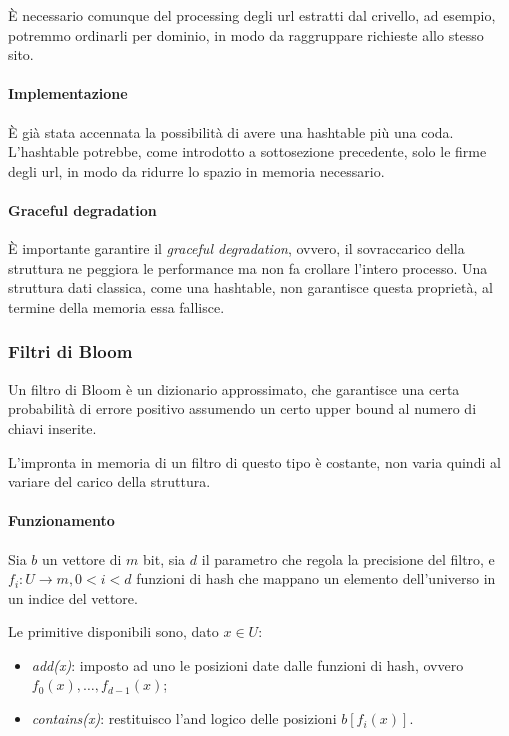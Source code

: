 \begin{remark}
    È necessario comunque del processing degli url estratti dal crivello, ad esempio, 
    potremmo ordinarli per dominio, in modo da raggruppare richieste allo stesso sito.
\end{remark}

\paragraph{Implementazione}
È già stata accennata la possibilità di avere una hashtable più una coda. 
L'hashtable potrebbe, come introdotto a sottosezione precedente, solo le firme degli url, in modo da ridurre lo spazio in memoria necessario.

\paragraph{Graceful degradation}
È importante garantire il \emph{graceful degradation}, ovvero, il sovraccarico della 
struttura ne peggiora le performance ma non fa crollare l'intero processo. 
Una struttura dati classica, come una hashtable, non garantisce questa proprietà, 
al termine della memoria essa fallisce.

\subsubsection{Filtri di Bloom}
Un filtro di Bloom è un dizionario approssimato, che garantisce una certa probabilità di errore positivo assumendo un certo upper bound al numero di chiavi inserite. 

L'impronta in memoria di un filtro di questo tipo è costante, non varia quindi al variare 
del carico della struttura.

\paragraph{Funzionamento}

Sia $b$ un vettore di $m$ bit, sia $d$ il parametro che regola la precisione del filtro,
e $f_i : U \rightarrow m, 0 < i < d$ funzioni di hash che mappano un elemento dell'universo 
in un indice del vettore. 

Le primitive disponibili sono, dato $x \in U$: 
\begin{itemize}
    \item \emph{add(x)}: imposto ad uno le posizioni date dalle funzioni di hash, 
    ovvero $f_0(x), \dots, f_{d-1}(x)$;
    \item \emph{contains(x)}: restituisco l'and logico delle posizioni $b[f_i(x)]$.
\end{itemize}


